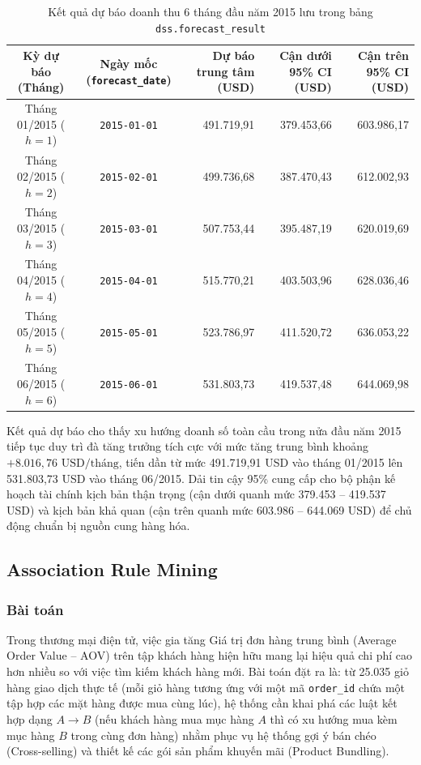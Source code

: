 \begin{table}[H]
\centering
\caption{Kết quả dự báo doanh thu 6 tháng đầu năm 2015 lưu trong bảng \texttt{dss.forecast\_result}}
\label{tab:forecast_results}
\small
\renewcommand{\arraystretch}{1.25}
\begin{tabularx}{\textwidth}{|c|c|r|r|r|}
\hline
\textbf{Kỳ dự báo (Tháng)} & \textbf{Ngày mốc (\texttt{forecast\_date})} & \textbf{Dự báo trung tâm (USD)} & \textbf{Cận dưới 95\% CI (USD)} & \textbf{Cận trên 95\% CI (USD)} \\
\hline
Tháng 01/2015 ($h=1$) & \texttt{2015-01-01} & 491.719,91 & 379.453,66 & 603.986,17 \\
\hline
Tháng 02/2015 ($h=2$) & \texttt{2015-02-01} & 499.736,68 & 387.470,43 & 612.002,93 \\
\hline
Tháng 03/2015 ($h=3$) & \texttt{2015-03-01} & 507.753,44 & 395.487,19 & 620.019,69 \\
\hline
Tháng 04/2015 ($h=4$) & \texttt{2015-04-01} & 515.770,21 & 403.503,96 & 628.036,46 \\
\hline
Tháng 05/2015 ($h=5$) & \texttt{2015-05-01} & 523.786,97 & 411.520,72 & 636.053,22 \\
\hline
Tháng 06/2015 ($h=6$) & \texttt{2015-06-01} & 531.803,73 & 419.537,48 & 644.069,98 \\
\hline
\end{tabularx}
\end{table}

Kết quả dự báo cho thấy xu hướng doanh số toàn cầu trong nửa đầu năm 2015 tiếp tục duy trì đà tăng trưởng tích cực với mức tăng trung bình khoảng $+8.016,76\text{ USD/tháng}$, tiến dần từ mức 491.719,91 USD vào tháng 01/2015 lên 531.803,73 USD vào tháng 06/2015. Dải tin cậy 95\% cung cấp cho bộ phận kế hoạch tài chính kịch bản thận trọng (cận dưới quanh mức 379.453 -- 419.537 USD) và kịch bản khả quan (cận trên quanh mức 603.986 -- 644.069 USD) để chủ động chuẩn bị nguồn cung hàng hóa.

\subsection{Association Rule Mining}

\subsubsection{Bài toán}

Trong thương mại điện tử, việc gia tăng Giá trị đơn hàng trung bình (Average Order Value -- AOV) trên tập khách hàng hiện hữu mang lại hiệu quả chi phí cao hơn nhiều so với việc tìm kiếm khách hàng mới. Bài toán đặt ra là: từ 25.035 giỏ hàng giao dịch thực tế (mỗi giỏ hàng tương ứng với một mã \texttt{order\_id} chứa một tập hợp các mặt hàng được mua cùng lúc), hệ thống cần khai phá các luật kết hợp dạng $A \rightarrow B$ (nếu khách hàng mua mục hàng $A$ thì có xu hướng mua kèm mục hàng $B$ trong cùng đơn hàng) nhằm phục vụ hệ thống gợi ý bán chéo (Cross-selling) và thiết kế các gói sản phẩm khuyến mãi (Product Bundling).

